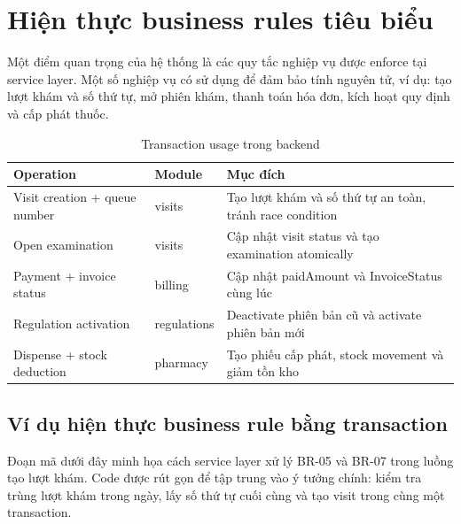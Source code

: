 \section{Hiện thực business rules tiêu biểu}

Một điểm quan trọng của hệ thống là các quy tắc nghiệp vụ được enforce tại service layer. Một số nghiệp vụ có sử dụng  để đảm bảo tính nguyên tử, ví dụ: tạo lượt khám và số thứ tự, mở phiên khám, thanh toán hóa đơn, kích hoạt quy định và cấp phát thuốc.

\begin{table}[H]
\centering
\caption{Transaction usage trong backend}
\begin{tabularx}{\textwidth}{|p{4cm}|p{3cm}|X|}
\hline
\textbf{Operation} & \textbf{Module} & \textbf{Mục đích} \\
\hline
Visit creation + queue number & visits & Tạo lượt khám và số thứ tự an toàn, tránh race condition \\
\hline
Open examination & visits & Cập nhật visit status và tạo examination atomically \\
\hline
Payment + invoice status & billing & Cập nhật paidAmount và InvoiceStatus cùng lúc \\
\hline
Regulation activation & regulations & Deactivate phiên bản cũ và activate phiên bản mới \\
\hline
Dispense + stock deduction & pharmacy & Tạo phiếu cấp phát, stock movement và giảm tồn kho \\
\hline
\end{tabularx}
\end{table}

\subsection{Ví dụ hiện thực business rule bằng transaction}

Đoạn mã dưới đây minh họa cách service layer xử lý BR-05 và BR-07 trong luồng tạo lượt khám. Code được rút gọn để tập trung vào ý tưởng chính: kiểm tra trùng lượt khám trong ngày, lấy số thứ tự cuối cùng và tạo visit trong cùng một transaction.

